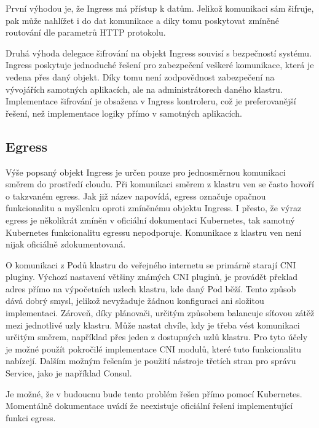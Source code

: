 První výhodou je, že Ingress má přístup k datům. Jelikož komunikaci sám šifruje, pak může nahlížet i do dat komunikace a díky tomu poskytovat zmíněné routování dle parametrů HTTP protokolu.

Druhá výhoda delegace šifrování na objekt Ingress souvisí s bezpečností systému. Ingress poskytuje jednoduché řešení pro zabezpečení veškeré komunikace, která je vedena přes daný objekt. Díky tomu není zodpovědnost zabezpečení na vývojářích samotných aplikacích, ale na administrátorech daného klastru. Implementace  šifrování je obsažena v Ingress kontroleru, což je preferovanější řešení, než implementace logiky přímo v samotných aplikacích. \cite{koke_2023_bezpen}

\subsection{Egress}
Výše popsaný objekt Ingress je určen pouze pro jednosměrnou komunikaci směrem do prostředí cloudu. Při komunikaci směrem z klastru ven se často hovoří o takzvaném egress. Jak již název napovídá, egress označuje opačnou funkcionalitu a myšlenku oproti zmíněnému objektu Ingress. I přesto, že výraz egress je několikrát zmíněn v oficiální dokumentaci Kubernetes, tak samotný Kubernetes funkcionalitu egressu nepodporuje. Komunikace z klastru ven není nijak oficiálně zdokumentovaná.

O komunikaci z Podů klastru do veřejného internetu se primárně starají CNI pluginy. Výchozí nastavení většiny známých CNI pluginů, je provádět překlad adres přímo na výpočetních uzlech klastru, kde daný Pod běží. Tento způsob dává dobrý smysl, jelikož nevyžaduje žádnou konfiguraci ani složitou implementaci. Zároveň, díky plánovači, určitým způsobem balancuje síťovou zátěž mezi jednotlivé uzly klastru. Může nastat chvíle, kdy je třeba vést komunikaci určitým směrem, například přes jeden z dostupných uzlů klastru. Pro tyto účely je možné použít pokročilé implementace CNI modulů, které tuto funkcionalitu nabízejí. \cite{yamamoto_2020_introducing} Dalším možným řešením je použití nástroje třetích stran pro správu Service, jako je například Consul.

Je možné, že v budoucnu bude tento problém řešen přímo pomocí Kubernetes. Momentálně dokumentace uvádí že neexistuje oficiální řešení implementující funkci egress. \cite{thekubernetesauthors_2022_network}


